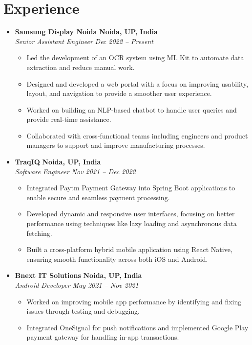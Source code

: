 \documentclass[10pt, a4paper]{article}
\begin{document}
\section*{Experience}
\begin{itemize}[leftmargin=0pt, itemsep=1ex, topsep=0.5ex, partopsep=0pt]
    \item
    \textbf{Samsung Display Noida} \hfill \textbf{Noida, UP, India} \\
    \textit{Senior Assistant Engineer} \hfill \textit{Dec 2022 -- Present}
    \begin{itemize}[leftmargin=1.5em, itemsep=0.5ex, topsep=0.5ex]
        \item Led the development of an OCR system using ML Kit to automate data extraction and reduce manual work.
        \item Designed and developed a web portal with a focus on improving usability, layout, and navigation to provide a smoother user experience.
        \item Worked on building an NLP-based chatbot to handle user queries and provide real-time assistance.
        \item Collaborated with cross-functional teams including engineers and product managers to support and improve manufacturing processes.
    \end{itemize}
    
    \item
    \textbf{TraqIQ} \hfill \textbf{Noida, UP, India} \\
    \textit{Software Engineer} \hfill \textit{Nov 2021 – Dec 2022}
    \begin{itemize}[leftmargin=1.5em, itemsep=0.5ex, topsep=0.5ex]
    \item Integrated Paytm Payment Gateway into Spring Boot applications to enable secure and seamless payment processing.
    \item Developed dynamic and responsive user interfaces, focusing on better performance using techniques like lazy loading and asynchronous data fetching.
    \item Built a cross-platform hybrid mobile application using React Native, ensuring smooth functionality across both iOS and Android.
\end{itemize}
    
    \item
\textbf{Bnext IT Solutions} \hfill \textbf{Noida, UP, India} \\
\textit{Android Developer} \hfill \textit{May 2021 -- Nov 2021}
\begin{itemize}[leftmargin=1.5em, itemsep=0.5ex, topsep=0.5ex]
    \item Worked on improving mobile app performance by identifying and fixing issues through testing and debugging.
    \item Integrated OneSignal for push notifications and implemented Google Play payment gateway for handling in-app transactions.
\end{itemize}
    

\end{itemize}
\end{document}
